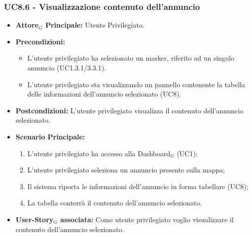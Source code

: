 \documentclass[11pt]{article}
\begin{document}
\begin{justify}
 \subsubsection{\textbf{UC8.6 - Visualizzazione contenuto dell'annuncio}}
 \begin{itemize}
     \item \textbf{Attore$_G$ Principale:} Utente Privilegiato.
     \item \textbf{Precondizioni:}
       \begin{itemize}
    	        \item L'utente privilegiato ha selezionato un marker, riferito ad un singolo annuncio (UC1.3.1/3.3.1).
          \item L'utente privilegiato sta visualizzando un pannello contenente la tabella delle informazioni dell'annuncio selezionato (UC8).
       \end{itemize}
     \item \textbf{Postcondizioni:} L'utente privilegiato visualizza il contenuto dell'annuncio selezionato.
     \item \textbf{Scenario Principale:}
        \begin{enumerate}
            \item L'utente privilegiato ha accesso alla Dashboard$_G$ (UC1);
            \item L'utente privilegiato seleziona un annuncio presente sulla mappa;
            \item Il sistema riporta le informazioni dell'annuncio in forma tabellare (UC8);
            \item La tabella conterrà il contenuto dell'annuncio selezionato.
        \end{enumerate}
     \item \textbf{User-Story$_G$ associata:} Come utente privilegiato voglio visualizzare il contenuto dell'annuncio selezionato. 
 \end{itemize}

\end{justify}
\end{document}
